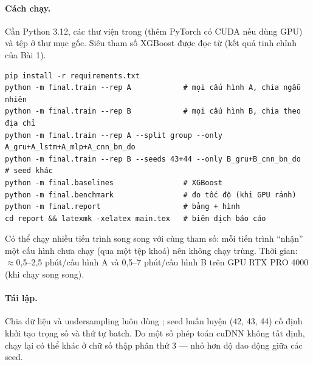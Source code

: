 \paragraph{Cách chạy.} Cần Python 3.12, các thư viện trong  (thêm PyTorch có CUDA nếu dùng GPU) và tệp
 ở thư mục gốc. Siêu tham số XGBoost được đọc từ  (kết quả tinh chỉnh
của Bài 1).
{\footnotesize
\begin{verbatim}
pip install -r requirements.txt
python -m final.train --rep A            # mọi cấu hình A, chia ngẫu nhiên
python -m final.train --rep B            # mọi cấu hình B, chia theo địa chỉ
python -m final.train --rep A --split group --only A_gru+A_lstm+A_mlp+A_cnn_bn_do
python -m final.train --rep B --seeds 43+44 --only B_gru+B_cnn_bn_do  # seed khác
python -m final.baselines                # XGBoost
python -m final.benchmark                # đo tốc độ (khi GPU rảnh)
python -m final.report                   # bảng + hình
cd report && latexmk -xelatex main.tex   # biên dịch báo cáo
\end{verbatim}
}
Có thể chạy nhiều tiến trình  song song với cùng tham số: mỗi tiến trình ``nhận'' một cấu hình chưa chạy
(qua một tệp khoá) nên không chạy trùng. Thời gian: $\approx$0,5--2,5 phút/cấu hình A và 0,5--7 phút/cấu hình B trên GPU RTX PRO 4000 (khi chạy song song).

\paragraph{Tái lập.} Chia dữ liệu và undersampling luôn dùng ; seed huấn luyện (42, 43, 44) cố định khởi tạo trọng số và thứ tự batch. Do một số phép
toán cuDNN không tất định, chạy lại có thể khác ở chữ số thập phân thứ 3 --- nhỏ hơn độ dao động giữa các seed.
